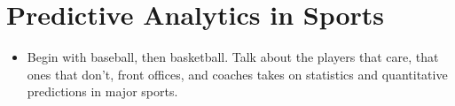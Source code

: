 \documentclass[../../fulltext/fulltext.tex]{subfiles}
\begin{document}
\chapter{Predictive Analytics in Sports}
\begin{itemize}
	\item Begin with baseball, then basketball.  Talk about the players that care, that ones that don't, front offices, and coaches takes on statistics and quantitative predictions in major sports.
\end{itemize}
\end{document}
